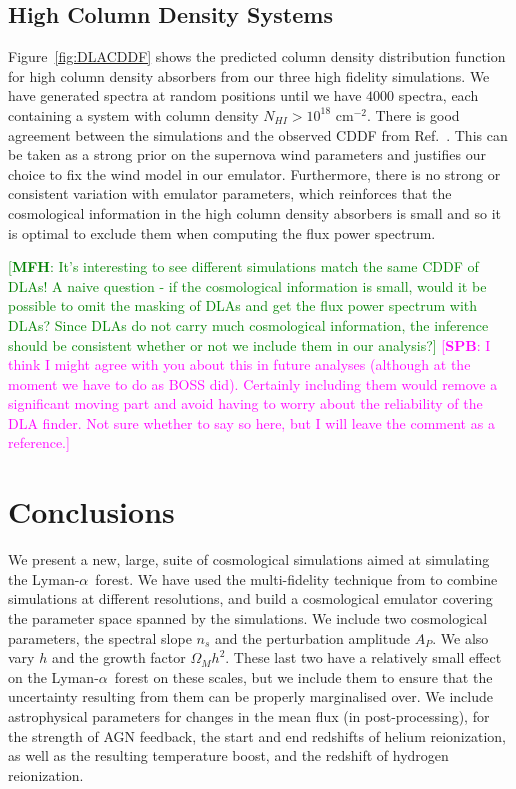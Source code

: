 \documentclass[a4paper,11pt]{article}
\newcommand{\mfh}[1]{{\textcolor{green}{[{\bf MFH}: #1]}}}
\newcommand{\spb}[1]{{\textcolor{magenta}{[{\bf SPB}: #1]}}}
\newcommand{\Lya}{Lyman-$\alpha$}
\begin{document}
\subsection{High Column Density Systems}

Figure~\ref{fig:DLACDDF} shows the predicted column density distribution function for high column density absorbers from our three high fidelity simulations. We have generated spectra at random positions until we have $4000$ spectra, each containing a system with column density $N_{HI} > 10^{18}$ cm$^{-2}$. There is good agreement between the simulations and the observed CDDF from Ref.~\cite{2021MNRAS.507..704H}. This can be taken as a strong prior on the supernova wind parameters and justifies our choice to fix the wind model in our emulator. Furthermore, there is no strong or consistent variation with emulator parameters, which reinforces that the cosmological information in the high column density absorbers is small and so it is optimal to exclude them when computing the flux power spectrum.

\mfh{It’s interesting to
see different simulations match the same CDDF of DLAs! A naive question - if the cosmological
information is small, would it be possible to omit the masking of DLAs and get the flux power
spectrum with DLAs? Since DLAs do not carry much cosmological information, the inference
should be consistent whether or not we include them in our analysis?}
\spb{I think I might agree with you about this in future analyses (although at the moment we have to do as BOSS did). Certainly including them would remove a significant moving part and avoid having to worry about the reliability of the DLA finder. Not sure whether to say so here, but I will leave the comment as a reference.}

\section{Conclusions}

We present a new, large, suite of cosmological simulations aimed at simulating the \Lya~forest. We have used the multi-fidelity technique from \cite{Ho:2022, Fernandez:2022} to combine simulations at different resolutions, and build a cosmological emulator covering the parameter space spanned by the simulations. We include two cosmological parameters, the spectral slope $n_s$ and the perturbation amplitude $A_P$. We also vary $h$ and the growth factor $\Omega_M h^2$. These last two have a relatively small effect on the \Lya~forest on these scales, but we include them to ensure that the uncertainty resulting from them can be properly marginalised over. We include astrophysical parameters for changes in the mean flux (in post-processing), for the strength of AGN feedback, the start and end redshifts of helium reionization, as well as the resulting temperature boost, and the redshift of hydrogen reionization.
\end{document}
